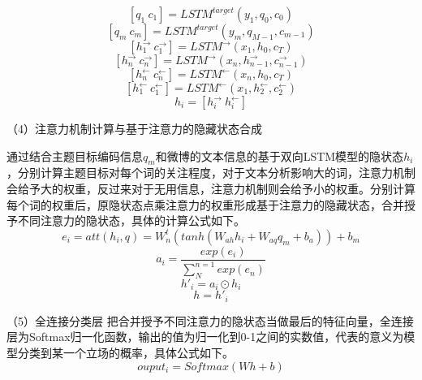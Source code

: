 \begin{equation}\label{lstm_f}[q_1~c_1] = LSTM^{target}(y_1,q_0,c_0)\end{equation}
\begin{equation}\label{lstm_f}[q_m~c_m] = LSTM^{target}(y_m,q_{M-1},c_{m-1})\end{equation}
\begin{equation}\label{lstm_f}[h^{→}_{1}~c^{→}_{1}] = LSTM^{→}(x_1,h_0,c_T)\end{equation}
\begin{equation}\label{lstm_f}[h^{→}_{n}~c^{→}_{n}] = LSTM^{→}(x_n,h^{→}_{n-1},c^{→}_{n-1})\end{equation}
\begin{equation}\label{lstm_f}[h^{←}_{n}~c^{←}_{n}] = LSTM^{←}(x_n,h_0,c_T)\end{equation}
\begin{equation}\label{lstm_f}[h^{←}_{1}~c^{←}_{1}] = LSTM^{←}(x_1,h^{←}_{2},c^{←}_{2})\end{equation}
\begin{equation}\label{lstm_f}h_i= [h^{→}_i~h^{←}_i]\end{equation}

（4）注意力机制计算与基于注意力的隐藏状态合成

通过结合主题目标编码信息$q_m$和微博的文本信息的基于双向LSTM模型的隐状态$h_i$，分别计算主题目标对每个词的关注程度，对于文本分析影响大的词，注意力机制会给予大的权重，反过来对于无用信息，注意力机制则会给予小的权重。分别计算每个词的权重后，原隐状态点乘注意力的权重形成基于注意力的隐藏状态，合并授予不同注意力的隐状态，具体的计算公式如下。
\begin{equation}\label{conv1} e_i=att(h_i,q)=W^t_n(tanh(W_{ah}h_i+W_{aq}q_m+b_a))+b_m \end{equation}
\begin{equation}\label{conv1} a_i=\frac{exp(e_i)}{\sum_{N}^{n=1}exp(e_n)} \end{equation}
\begin{equation}\label{conv1} h'_i=a_i \odot h_i \end{equation}
\begin{equation}\label{conv1} h = h'_i \end{equation}

（5）全连接分类层
把合并授予不同注意力的隐状态当做最后的特征向量，全连接层为Softmax归一化函数，输出的值为归一化到0-1之间的实数值，代表的意义为模型分类到某一个立场的概率，具体公式如下。
\begin{equation}\label{conv1} ouput_i=Softmax(Wh+b) \end{equation}



